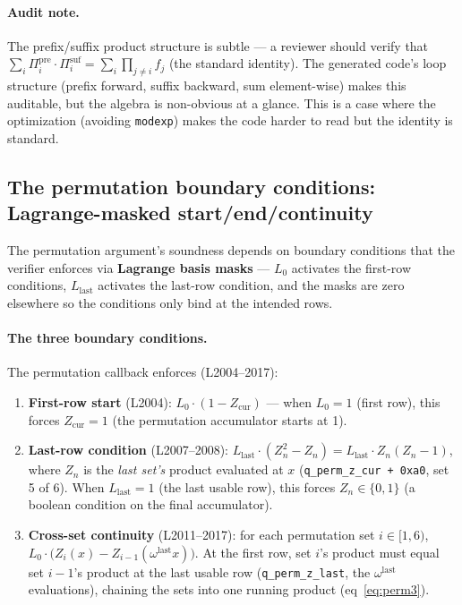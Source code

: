 \paragraph{Audit note.} The prefix/suffix product structure is
subtle --- a reviewer should verify that
$\sum_i \Pi^{\text{pre}}_i \cdot \Pi^{\text{suf}}_i = \sum_i
\prod_{j\ne i} f_j$ (the standard identity). The generated
code's loop structure (prefix forward, suffix backward, sum
element-wise) makes this auditable, but the algebra is non-obvious
at a glance. This is a case where the optimization (avoiding
\texttt{modexp}) makes the code harder to read but the identity
is standard.

\subsection{The permutation boundary conditions: Lagrange-masked start/end/continuity}
\label{sec:pr-perm-boundary}

The permutation argument's soundness depends on boundary
conditions that the verifier enforces via \textbf{Lagrange basis
masks} --- $L_0$ activates the first-row conditions, $L_{\text{last}}$
activates the last-row condition, and the masks are zero elsewhere
so the conditions only bind at the intended rows.

\paragraph{The three boundary conditions.} The permutation
callback enforces (L2004--2017):
\begin{enumerate}
\item \textbf{First-row start} (L2004):
  $L_0 \cdot (1 - Z_{\text{cur}})$ --- when $L_0 = 1$ (first
  row), this forces $Z_{\text{cur}} = 1$ (the permutation
  accumulator starts at 1).
\item \textbf{Last-row condition} (L2007--2008):
  $L_{\text{last}} \cdot (Z_n^2 - Z_n) = L_{\text{last}} \cdot
  Z_n(Z_n - 1)$, where $Z_n$ is the \emph{last set's} product
  evaluated at $x$ (\texttt{q\_\allowbreak{}perm\_\allowbreak{}z\_\allowbreak{}cur + 0xa0}, set 5 of 6).
  When $L_{\text{last}} = 1$ (the last usable row), this forces
  $Z_n \in \{0, 1\}$ (a boolean condition on the final accumulator).
\item \textbf{Cross-set continuity} (L2011--2017): for each
  permutation set $i \in [1, 6)$,
  $L_0 \cdot \bigl(Z_i(x) - Z_{i-1}(\omega^{\text{last}}x)\bigr)$.
  At the first row, set $i$'s product must equal set $i-1$'s product
  at the last usable row (\texttt{q\_perm\_z\_last}, the
  $\omega^{\text{last}}$ evaluations), chaining the sets into one
  running product (eq~\eqref{eq:perm3}).
\end{enumerate}

